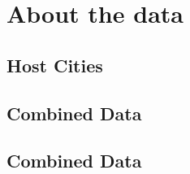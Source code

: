 \documentclass[a4 paper, 12pt]{article}
\begin{document}
\pagebreak
\appendix
\appendixpage
\addappheadtotoc
\section{About the data}

\subsection{Host Cities}


\pagebreak
\subsection{Combined Data}


\pagebreak
\subsection{Combined Data}

\end{document}
